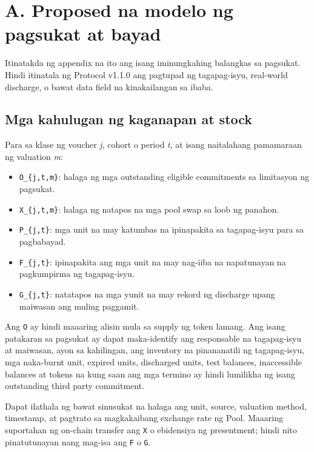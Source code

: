\documentclass[11pt]{article}
\begin{document}
\section*{A. Proposed na modelo ng pagsukat at bayad}

Itinatakda ng appendix na ito ang isang iminungkahing balangkas sa pagsukat. Hindi itinatala ng Protocol v1.1.0 ang pagtupad ng tagapag-isyu, real-world discharge, o bawat data field na kinakailangan sa ibaba.

\subsection*{Mga kahulugan ng kaganapan at stock}

Para sa klase ng voucher \emph{j}, cohort o period \emph{t}, at isang naitalahang pamamaraan ng valuation \emph{m}:

\begin{itemize}[leftmargin=*]
\item \texttt{O\_\{j,t,m\}}: halaga ng mga outstanding eligible commitments sa limitasyon ng pagsukat.
\item \texttt{X\_\{j,t,m\}}: halaga ng natapos na mga pool swap sa loob ng panahon.
\item \texttt{P\_\{j,t\}}: mga unit na may katumbas na ipinapakita sa tagapag-isyu para sa pagbabayad.
\item \texttt{F\_\{j,t\}}: ipinapakita ang mga unit na may nag-iiba na napatunayan na pagkumpirma ng tagapag-isyu.
\item \texttt{G\_\{j,t\}}: natatapos na mga yunit na may rekord ng discharge upang maiwasan ang muling paggamit.
\end{itemize}
Ang \texttt{O} ay hindi maaaring alisin mula sa supply ng token lamang. Ang isang patakaran sa pagsukat ay dapat maka-identify ang responsable na tagapag-isyu at maiwasan, ayon sa kahilingan, ang inventory na pinananatili ng tagapag-isyu, mga naka-burnt unit, expired units, discharged units, test balances, inaccessible balances at tokens na kung saan ang mga termino ay hindi lumilikha ng isang outstanding third party commitment.

Dapat ilathala ng bawat sinusukat na halaga ang unit, source, valuation method, timestamp, at pagtrato sa magkakaibang exchange rate ng Pool. Maaaring suportahan ng on-chain transfer ang \texttt{X} o ebidensiya ng presentment; hindi nito pinatutunayan nang mag-isa ang \texttt{F} o \texttt{G}.
\end{document}
